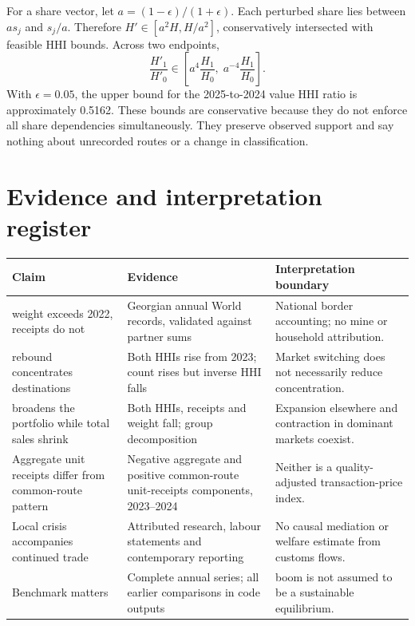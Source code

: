 \documentclass[11pt,a4paper]{article}
\begin{document}
For a share vector, let $a=(1-\epsilon)/(1+\epsilon)$. Each perturbed share lies between $a s_j$ and $s_j/a$. Therefore $H'\in[a^2H,H/a^2]$, conservatively intersected with feasible HHI bounds. Across two endpoints,
\begin{equation}
 \frac{H'_1}{H'_0}\in\left[a^4\frac{H_1}{H_0},\;a^{-4}\frac{H_1}{H_0}\right].
\end{equation}
With $\epsilon=0.05$, the upper bound for the 2025-to-2024 value HHI ratio is approximately 0.5162. These bounds are conservative because they do not enforce all share dependencies simultaneously. They preserve observed support and say nothing about unrecorded routes or a change in classification.

\clearpage
\section{Evidence and interpretation register}
\small
\begin{longtable}{>{\raggedright\arraybackslash}p{.26\linewidth}>{\raggedright\arraybackslash}p{.30\linewidth}>{\raggedright\arraybackslash}p{.33\linewidth}}
\toprule Claim & Evidence & Interpretation boundary\\\midrule\endhead
2024 weight exceeds 2022, receipts do not & Georgian annual World records, validated against partner sums & National border accounting; no mine or household attribution.\\[4pt]
2024 rebound concentrates destinations & Both HHIs rise from 2023; count rises but inverse HHI falls & Market switching does not necessarily reduce concentration.\\[4pt]
2025 broadens the portfolio while total sales shrink & Both HHIs, receipts and weight fall; group decomposition & Expansion elsewhere and contraction in dominant markets coexist.\\[4pt]
Aggregate unit receipts differ from common-route pattern & Negative aggregate and positive common-route unit-receipts components, 2023--2024 & Neither is a quality-adjusted transaction-price index.\\[4pt]
Local crisis accompanies continued trade & Attributed research, labour statements and contemporary reporting & No causal mediation or welfare estimate from customs flows.\\[4pt]
Benchmark matters & Complete annual series; all earlier comparisons in code outputs & 2022 boom is not assumed to be a sustainable equilibrium.\\\bottomrule
\end{longtable}
\end{document}

